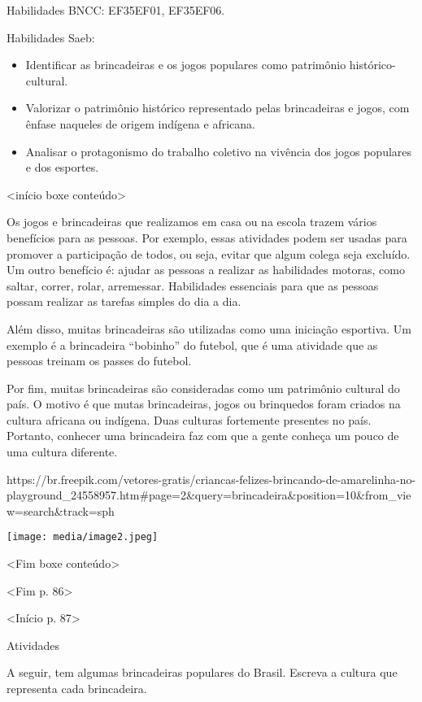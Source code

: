 {{{{{Habilidades BNCC: EF35EF01, EF35EF06.

Habilidades Saeb:

\begin{itemize}
\item
  Identificar as brincadeiras e os jogos populares como patrimônio
  histórico-cultural.
\item
  Valorizar o patrimônio histórico representado pelas brincadeiras e
  jogos, com ênfase naqueles de origem indígena e africana.
\item
  Analisar o protagonismo do trabalho coletivo na vivência dos jogos
  populares e dos esportes.
\end{itemize}

\textless{}início boxe conteúdo\textgreater{}

Os jogos e brincadeiras que realizamos em casa ou na escola trazem
vários benefícios para as pessoas. Por exemplo, essas atividades podem
ser usadas para promover a participação de todos, ou seja, evitar que
algum colega seja excluído. Um outro benefício é: ajudar as pessoas a
realizar as habilidades motoras, como saltar, correr, rolar, arremessar.
Habilidades essenciais para que as pessoas possam realizar as tarefas
simples do dia a dia.

Além disso, muitas brincadeiras são utilizadas como uma iniciação
esportiva. Um exemplo é a brincadeira ``bobinho'' do futebol, que é uma
atividade que as pessoas treinam os passes do futebol.

Por fim, muitas brincadeiras são consideradas como um patrimônio
cultural do país. O motivo é que mutas brincadeiras, jogos ou brinquedos
foram criados na cultura africana ou indígena. Duas culturas fortemente
presentes no país. Portanto, conhecer uma brincadeira faz com que a
gente conheça um pouco de uma cultura diferente.

https://br.freepik.com/vetores-gratis/criancas-felizes-brincando-de-amarelinha-no-playground\_24558957.htm\#page=2\&query=brincadeira\&position=10\&from\_view=search\&track=sph

\texttt{[image: media/image2.jpeg]}

\textless{}Fim boxe conteúdo\textgreater{}

\textless{}Fim p. 86\textgreater{}

\textless{}Início p. 87\textgreater{}

Atividades

\num{} A seguir, tem algumas brincadeiras populares do Brasil. Escreva a
  cultura que representa cada brincadeira.

}}}}}
